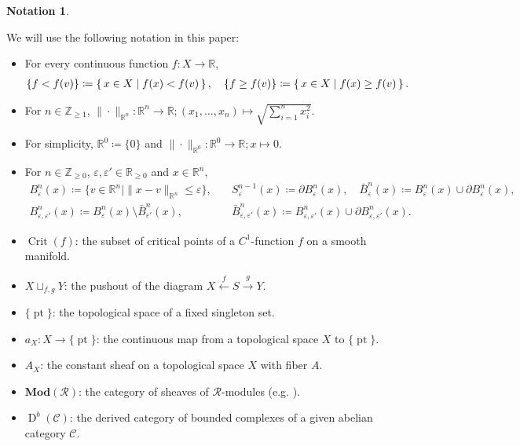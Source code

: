 \documentclass[a4paper,dvipdfmx,reqno,12pt]{amsart}
\theoremstyle{definition}
\newtheorem{notation}[theorem]{Notation}
\newcommand{\deq}{\coloneqq}
\newcommand{\opn}[1]{\operatorname{#1}}
\newcommand{\catn}[1]{\mathbf{#1}}
\newcommand{\xto}[1]{\xrightarrow{#1}}
\newcommand{\xgets}[1]{\xleftarrow{#1}}
\numberwithin{equation}{section}
\begin{document}
\begin{notation} \label{notation-general}

We will use the following notation in this paper:

\begin{itemize}
\item For every continuous function $f\colon X\to {\mathbb{R}}$,
\begin{align*}
\{f<f(v)\}\deq \set{x\in X\mid f(x)< f(v)},\quad
\{f\geq f(v)\}\deq \set{x\in X\mid f(x)\geq f(v)}.
\end{align*}
\item  For $n\in \mathbb{Z}_{\geq 1}$,
$\|\cdot \|_{\mathbb{R}^{n}}\colon 
\mathbb{R}^{n}\to \mathbb{R};(x_1,\ldots,x_n)\mapsto 
\sqrt{\sum_{i=1}^{n}x_i^{2}}$.
\item For simplicity, $\mathbb{R}^{0}\deq \{0\}$ 
and 
$\|\cdot\|_{\mathbb{R}^{0}}\colon \mathbb{R}^{0}\to \mathbb{R}
; x\mapsto 0$.
\item For $n\in \mathbb{Z}_{\geq 0}$, $\varepsilon,\varepsilon'\in \mathbb{R}_{\geq 0}$
and $x \in \mathbb{R}^{n}$, 
\begin{align*}
B^{n}_{\varepsilon}(x)\deq 
\{v\in \mathbb{R}^{n}\mid \|x-v\|_{\mathbb{R}^{n}}
\leq \varepsilon\},
& \quad  
S^{n-1}_{\varepsilon}(x)\deq \partial B^{n}_{\varepsilon}(x),
\quad \bar{B}^{n}_{\varepsilon}(x)\deq 
B^{n}_{\varepsilon}(x)\cup \partial B^{n}_{\varepsilon}(x),  \\
B_{\varepsilon,\varepsilon'}^{n}(x)\deq 
B^{n}_{\varepsilon}(x)\setminus 
\bar{B}^{n}_{\varepsilon '}(x), 
& \quad \bar{B}_{\varepsilon,\varepsilon'}^{n}(x)\deq 
B_{\varepsilon,\varepsilon'}^{n}(x)\cup 
\partial B_{\varepsilon,\varepsilon'}^{n}(x).
\end{align*}
\item $\opn{Crit}(f)$: the subset of critical points of
a $C^{1}$-function $f$ on a smooth manifold.
\item   $X\sqcup_{f,g}Y$: the pushout of the diagram
  $X\xgets{f} S\xto{g} Y$.
\item $\{\opn{pt}\}$: the topological space of 
a fixed singleton set.
\item $a_X\colon X\to \{\opn{pt}\}$:
the continuous map from a topological space $X$ to
$\{\opn{pt}\}$.
\item $A_X$: the constant sheaf on a topological space $X$ 
with fiber $A$.
\item $\catn{Mod}(\mathcal{R})$: the category of 
sheaves of $\mathcal{R}$-modules
(e.g. \cite[Definition 2.2.6]{MR1299726}).
\item $\opn{D}^{b}(\mathcal{C})$: the derived category
of bounded complexes of a given abelian category 
$\mathcal{C}$.
\end{itemize}

\end{notation}
\end{document}
